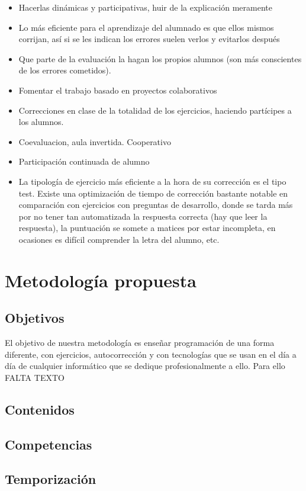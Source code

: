 \begin{enumerate}
\begin{itemize}
    \item Hacerlas dinámicas y participativas, huir de la explicación meramente
    \item Lo más eficiente para el aprendizaje del alumnado es que ellos mismos corrijan, así si se les indican los errores suelen verlos y evitarlos después
    \item Que parte de la evaluación la hagan los propios alumnos (son más conscientes de los errores cometidos).
    \item Fomentar el trabajo basado en proyectos colaborativos
    \item Correcciones en clase de la totalidad de los ejercicios, haciendo partícipes a los alumnos.
    \item Coevaluacion, aula invertida. Cooperativo
    \item Participación continuada de alumno
    \item La tipología de ejercicio más eficiente a la hora de su corrección es el tipo test. Existe una optimización de tiempo de corrección bastante notable en comparación con ejercicios con preguntas de desarrollo, donde se tarda más por no tener tan automatizada la respuesta correcta (hay que leer la respuesta), la puntuación se somete a matices por estar incompleta, en ocasiones es difícil comprender la letra del alumno, etc.
\end{itemize}


\end{enumerate}

\section{Metodología propuesta}


\subsection{Objetivos}

El objetivo de nuestra metodología es enseñar programación de una forma diferente, con ejercicios, autocorrección y con tecnologías que se usan en el día a día de cualquier informático que se dedique profesionalmente a ello. Para ello FALTA TEXTO

\subsection{Contenidos}

\subsection{Competencias}

\subsection{Temporización}




